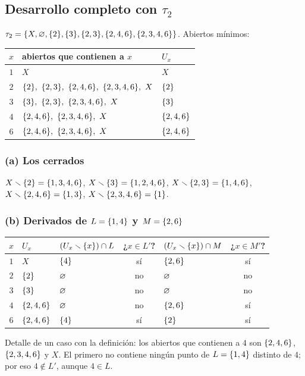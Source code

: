 
\subsection{Desarrollo completo con \texorpdfstring{$\tau_2$}{tau2}}
$\tau_2=\{X,\varnothing,\{2\},\{3\},\{2,3\},\{2,4,6\},\{2,3,4,6\}\}$. Abiertos mínimos:
\begin{center}\small\renewcommand{\arraystretch}{1.2}
\begin{tabular}{@{}cll@{}}\toprule
$x$ & abiertos que contienen a $x$ & $U_x$\\ \midrule
$1$ & $X$ & $X$\\
$2$ & $\s{2},\ \s{2,3},\ \s{2,4,6},\ \s{2,3,4,6},\ X$ & $\{2\}$\\
$3$ & $\s{3},\ \s{2,3},\ \s{2,3,4,6},\ X$ & $\{3\}$\\
$4$ & $\s{2,4,6},\ \s{2,3,4,6},\ X$ & $\{2,4,6\}$\\
$6$ & $\s{2,4,6},\ \s{2,3,4,6},\ X$ & $\{2,4,6\}$\\ \bottomrule
\end{tabular}\end{center}

\subsubsection*{(a) Los cerrados}
$X\smallsetminus\{2\}=\{1,3,4,6\}$, $X\smallsetminus\{3\}=\{1,2,4,6\}$, $X\smallsetminus\{2,3\}=\{1,4,6\}$, $X\smallsetminus\{2,4,6\}=\{1,3\}$,
$X\smallsetminus\{2,3,4,6\}=\{1\}$.

\subsubsection*{(b) Derivados de $L=\{1,4\}$ y $M=\{2,6\}$}
\begin{center}\small\renewcommand{\arraystretch}{1.2}
\begin{tabular}{@{}cl|lc|lc@{}}\toprule
$x$ & $U_x$ & $(U_x\smallsetminus\{x\})\cap L$ & ¿$x\in L'$? & $(U_x\smallsetminus\{x\})\cap M$ & ¿$x\in M'$?\\ \midrule
$1$ & $X$ & $\{4\}$ & sí & $\{2,6\}$ & sí\\
$2$ & $\{2\}$ & $\varnothing$ & no & $\varnothing$ & no\\
$3$ & $\{3\}$ & $\varnothing$ & no & $\varnothing$ & no\\
$4$ & $\{2,4,6\}$ & $\varnothing$ & no & $\{2,6\}$ & sí\\
$6$ & $\{2,4,6\}$ & $\{4\}$ & sí & $\{2\}$ & sí\\ \bottomrule
\end{tabular}\end{center}
Detalle de un caso con la definición: los abiertos que contienen a $4$ son $\{2,4,6\}$, $\{2,3,4,6\}$ y $X$. El
primero no contiene ningún punto de $L=\{1,4\}$ distinto de $4$; por eso $4\notin L'$, aunque $4\in L$.

